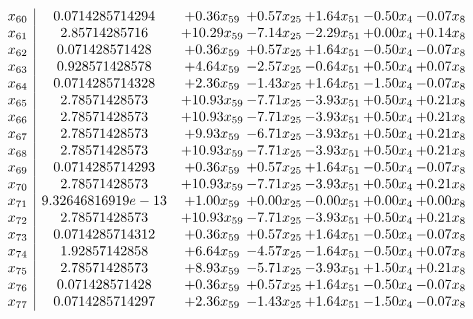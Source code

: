 \documentclass[8pt]{article}
\begin{document}
\[\begin{array}{c| c c@{\hskip 2pt} c@{\hskip 2pt} c@{\hskip 2pt} c@{\hskip 2pt} c@{\hskip 2pt} }
 x_{60}   &  0.0714285714294 & +  0.36 x_{59} & +  0.57 x_{25} & +  1.64 x_{51} & -0.50 x_{4} & -0.07 x_{8}\\
 x_{61}   &  2.85714285716 & + 10.29 x_{59} & -7.14 x_{25} & -2.29 x_{51} & +  0.00 x_{4} & +  0.14 x_{8}\\
 x_{62}   &  0.071428571428 & +  0.36 x_{59} & +  0.57 x_{25} & +  1.64 x_{51} & -0.50 x_{4} & -0.07 x_{8}\\
 x_{63}   &  0.928571428578 & +  4.64 x_{59} & -2.57 x_{25} & -0.64 x_{51} & +  0.50 x_{4} & +  0.07 x_{8}\\
 x_{64}   &  0.0714285714328 & +  2.36 x_{59} & -1.43 x_{25} & +  1.64 x_{51} & -1.50 x_{4} & -0.07 x_{8}\\
 x_{65}   &  2.78571428573 & + 10.93 x_{59} & -7.71 x_{25} & -3.93 x_{51} & +  0.50 x_{4} & +  0.21 x_{8}\\
 x_{66}   &  2.78571428573 & + 10.93 x_{59} & -7.71 x_{25} & -3.93 x_{51} & +  0.50 x_{4} & +  0.21 x_{8}\\
 x_{67}   &  2.78571428573 & +  9.93 x_{59} & -6.71 x_{25} & -3.93 x_{51} & +  0.50 x_{4} & +  0.21 x_{8}\\
 x_{68}   &  2.78571428573 & + 10.93 x_{59} & -7.71 x_{25} & -3.93 x_{51} & +  0.50 x_{4} & +  0.21 x_{8}\\
 x_{69}   &  0.0714285714293 & +  0.36 x_{59} & +  0.57 x_{25} & +  1.64 x_{51} & -0.50 x_{4} & -0.07 x_{8}\\
 x_{70}   &  2.78571428573 & + 10.93 x_{59} & -7.71 x_{25} & -3.93 x_{51} & +  0.50 x_{4} & +  0.21 x_{8}\\
 x_{71}   &  9.32646816919e-13 & +  1.00 x_{59} & +  0.00 x_{25} & -0.00 x_{51} & +  0.00 x_{4} & +  0.00 x_{8}\\
 x_{72}   &  2.78571428573 & + 10.93 x_{59} & -7.71 x_{25} & -3.93 x_{51} & +  0.50 x_{4} & +  0.21 x_{8}\\
 x_{73}   &  0.0714285714312 & +  0.36 x_{59} & +  0.57 x_{25} & +  1.64 x_{51} & -0.50 x_{4} & -0.07 x_{8}\\
 x_{74}   &  1.92857142858 & +  6.64 x_{59} & -4.57 x_{25} & -1.64 x_{51} & -0.50 x_{4} & +  0.07 x_{8}\\
 x_{75}   &  2.78571428573 & +  8.93 x_{59} & -5.71 x_{25} & -3.93 x_{51} & +  1.50 x_{4} & +  0.21 x_{8}\\
 x_{76}   &  0.071428571428 & +  0.36 x_{59} & +  0.57 x_{25} & +  1.64 x_{51} & -0.50 x_{4} & -0.07 x_{8}\\
 x_{77}   &  0.0714285714297 & +  2.36 x_{59} & -1.43 x_{25} & +  1.64 x_{51} & -1.50 x_{4} & -0.07 x_{8}\\

\end{array}\]
\end{document}
